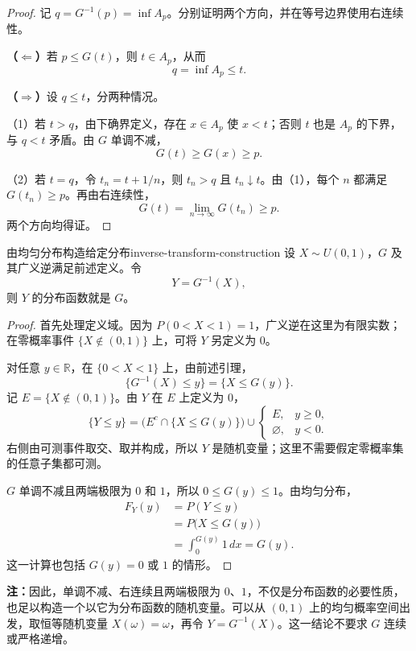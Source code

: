 \begin{proof}
记 $q=G^{-1}(p)=\inf A_p$。分别证明两个方向，并在等号边界使用右连续性。

\textbf{（$\Leftarrow$）}\quad 若 $p\leq G(t)$，则 $t\in A_p$，从而
\[
q=\inf A_p\leq t.
\]

\textbf{（$\Rightarrow$）}\quad 设 $q\leq t$，分两种情况。

（1）若 $t>q$，由下确界定义，存在 $x\in A_p$ 使 $x<t$；否则 $t$ 也是 $A_p$ 的下界，与 $q<t$ 矛盾。由 $G$ 单调不减，
\[
G(t)\geq G(x)\geq p.
\]

（2）若 $t=q$，令 $t_n=t+1/n$，则 $t_n>q$ 且 $t_n\downarrow t$。由（1），每个 $n$ 都满足 $G(t_n)\geq p$。再由右连续性，
\[
G(t)=\lim_{n\to\infty}G(t_n)\geq p.
\]
两个方向均得证。
\end{proof}

\begin{mytheorem}{由均匀分布构造给定分布}{inverse-transform-construction}
设 $X\sim U(0,1)$，$G$ 及其广义逆满足前述定义。令
\[
Y=G^{-1}(X),
\]
则 $Y$ 的分布函数就是 $G$。
\end{mytheorem}

\begin{proof}
首先处理定义域。因为 $P(0<X<1)=1$，广义逆在这里为有限实数；在零概率事件 $\{X\notin(0,1)\}$ 上，可将 $Y$ 另定义为 $0$。

对任意 $y\in\mathbb R$，在 $\{0<X<1\}$ 上，由前述引理，
\[
\{G^{-1}(X)\leq y\}=\{X\leq G(y)\}.
\]
记 $E=\{X\notin(0,1)\}$。由 $Y$ 在 $E$ 上定义为 $0$，
\[
\{Y\leq y\}
=\bigl(E^c\cap\{X\leq G(y)\}\bigr)
\cup
\begin{cases}
E,&y\geq0,\\
\varnothing,&y<0.
\end{cases}
\]
右侧由可测事件取交、取并构成，所以 $Y$ 是随机变量；这里不需要假定零概率集的任意子集都可测。

$G$ 单调不减且两端极限为 $0$ 和 $1$，所以 $0\leq G(y)\leq1$。由均匀分布，
\begin{align*}
F_Y(y)
&=P(Y\leq y)\\
&=P\bigl(X\leq G(y)\bigr)\\
&=\int_0^{G(y)}1\,dx
=G(y).
\end{align*}
这一计算也包括 $G(y)=0$ 或 $1$ 的情形。
\end{proof}

\textbf{注：}\quad 因此，单调不减、右连续且两端极限为 $0$、$1$，不仅是分布函数的必要性质，也足以构造一个以它为分布函数的随机变量。可以从 $(0,1)$ 上的均匀概率空间出发，取恒等随机变量 $X(\omega)=\omega$，再令 $Y=G^{-1}(X)$。这一结论不要求 $G$ 连续或严格递增。

